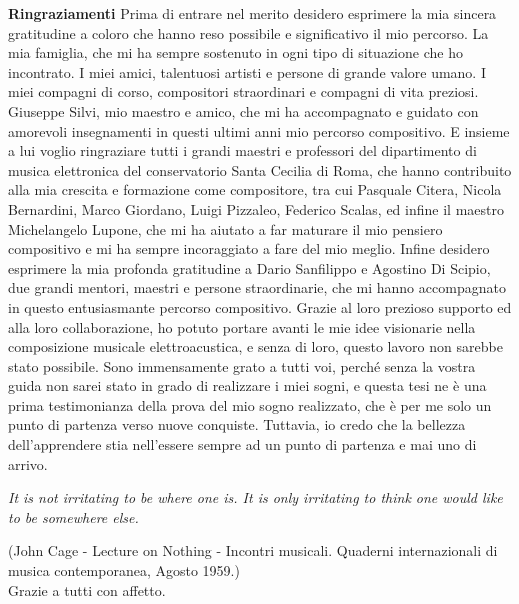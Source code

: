 \vfill
\LARGE \textbf{Ringraziamenti} \normalsize \newline \newline
Prima di entrare nel merito desidero esprimere la mia sincera gratitudine 
a coloro che hanno reso possibile e significativo il mio percorso.
La mia famiglia, che mi ha sempre sostenuto in ogni tipo di situazione che ho incontrato.
I miei amici, talentuosi artisti e persone di grande valore umano.
I miei compagni di corso, compositori straordinari e compagni di vita preziosi.
Giuseppe Silvi, mio maestro e amico, che mi ha accompagnato e guidato con amorevoli insegnamenti 
in questi ultimi anni mio percorso compositivo.
E insieme a lui voglio ringraziare tutti i grandi maestri e professori del dipartimento di 
musica elettronica del conservatorio Santa Cecilia di Roma, 
che hanno contribuito alla mia crescita e formazione come compositore, 
tra cui Pasquale Citera, Nicola Bernardini, Marco Giordano, Luigi Pizzaleo, 
Federico Scalas, ed infine il maestro Michelangelo Lupone, 
che mi ha aiutato a far maturare il mio pensiero compositivo e 
mi ha sempre incoraggiato a fare del mio meglio.
Infine desidero esprimere la mia profonda gratitudine a Dario Sanfilippo e Agostino Di Scipio, 
due grandi mentori, maestri e persone straordinarie, 
che mi hanno accompagnato in questo entusiasmante percorso compositivo. 
Grazie al loro prezioso supporto ed alla loro collaborazione, 
ho potuto portare avanti le mie idee visionarie nella composizione musicale elettroacustica,
e senza di loro, questo lavoro non sarebbe stato possibile. 
Sono immensamente grato a tutti voi, 
perché senza la vostra guida non sarei stato in grado di realizzare i miei sogni, 
e questa tesi ne è una prima testimonianza della prova del mio sogno realizzato, 
che è per me solo un punto di partenza verso nuove conquiste.
Tuttavia, io credo che la bellezza dell'apprendere stia nell'essere sempre 
ad un punto di partenza e mai uno di arrivo. 
\begin{center} \textit{
It is not irritating to be where one is. 
It is only irritating to think one would like to be somewhere else.} \\
\end{center}
(John Cage - Lecture on Nothing - Incontri musicali. 
Quaderni internazionali di musica contemporanea, Agosto 1959.) \\
Grazie a tutti con affetto.